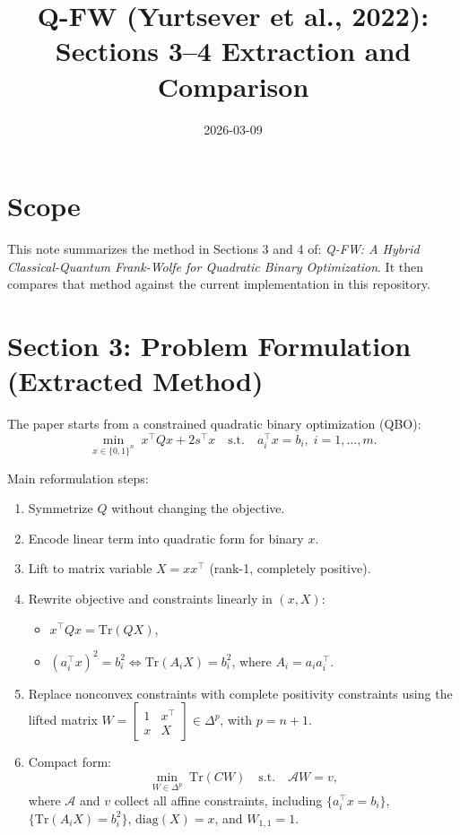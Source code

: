 \documentclass[11pt]{article}
\title{Q-FW (Yurtsever et al., 2022): Sections 3--4 Extraction and Comparison}
\author{}
\date{2026-03-09}
\begin{document}
\maketitle

\section{Scope}
This note summarizes the method in Sections 3 and 4 of:
\emph{Q-FW: A Hybrid Classical-Quantum Frank-Wolfe for Quadratic Binary Optimization}.
It then compares that method against the current implementation in this repository.

\section{Section 3: Problem Formulation (Extracted Method)}
The paper starts from a constrained quadratic binary optimization (QBO):
\begin{equation}
\min_{x \in \{0,1\}^n} \; x^\top Q x + 2 s^\top x
\quad \text{s.t.} \quad a_i^\top x = b_i,\; i=1,\dots,m.
\end{equation}

Main reformulation steps:
\begin{enumerate}
\item Symmetrize $Q$ without changing the objective.
\item Encode linear term into quadratic form for binary $x$.
\item Lift to matrix variable $X = xx^\top$ (rank-1, completely positive).
\item Rewrite objective and constraints linearly in $(x, X)$:
\begin{itemize}
\item $x^\top Q x = \mathrm{Tr}(QX)$,
\item $(a_i^\top x)^2 = b_i^2 \iff \mathrm{Tr}(A_i X) = b_i^2$, where $A_i = a_i a_i^\top$.
\end{itemize}
\item Replace nonconvex constraints with complete positivity constraints using the lifted matrix
\(W = \begin{bmatrix}1 & x^\top \\ x & X\end{bmatrix} \in \Delta^p\), with $p=n+1$.
\item Compact form:
\begin{equation}
\min_{W \in \Delta^p} \; \mathrm{Tr}(CW)
\quad \text{s.t.} \quad \mathcal{A}W = v,
\end{equation}
where $\mathcal{A}$ and $v$ collect all affine constraints, including
$\{a_i^\top x=b_i\}$, $\{\mathrm{Tr}(A_iX)=b_i^2\}$, $\mathrm{diag}(X)=x$, and $W_{1,1}=1$.
\end{enumerate}
\end{document}
